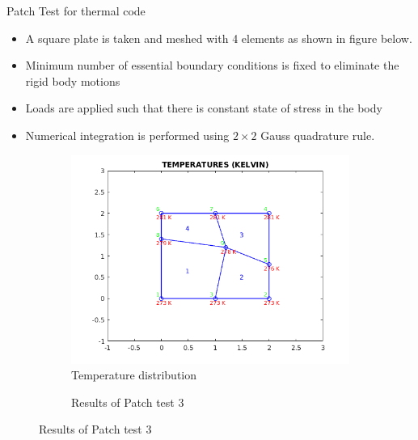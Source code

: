 \documentclass{beamer}
\begin{document}
\begin{frame}[t,fragile]{Patch Test for thermal code }
    \vspace{-.4cm}
    \footnotesize
 \begin{itemize}
        \item A square plate is taken and meshed with 4 elements as shown in figure below. 
        \item Minimum number of essential boundary conditions is fixed to eliminate the rigid body motions
        \item Loads are applied such that there is constant state of stress in the body
        \item Numerical integration is performed using $2\times 2$ Gauss quadrature rule.
    \end{itemize}
    \begin{figure}
    \vspace{.5cm}
    \hspace{-.5cm}
\begin{subfigure}{0.3\textwidth}
     \centering
    \includegraphics[scale=.2]{solution.jpg}
    \caption{\tiny Temperature distribution}
\end{subfigure}
\begin{subfigure}{0.6\textwidth}
    \vspace{-1cm}
    \centering
    \caption{\scriptsize Results of Patch test 3}
\end{subfigure}
\end{figure}
\end{frame}
\end{document}
